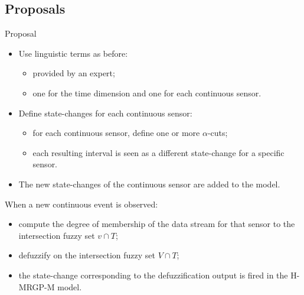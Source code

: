 \documentclass[9pt, handout]{beamer}
\begin{document}
    \subsection{Proposals}
      \begin{frame}{Proposal}
        \pause
        \begin{itemize}
          \item Use linguistic terms as before:
          \begin{itemize}
            \item provided by an expert;
            \item one for the time dimension and one for each continuous sensor.
          \end{itemize}
          \pause
          \item Define state-changes for each continuous sensor:
          \begin{itemize}
            \item for each continuous sensor, define one or more $\alpha$-cuts;
            \item each resulting interval is seen as a different state-change for a specific sensor.
          \end{itemize}
          \pause
          \item The new state-changes of the continuous sensor are added to the model.
        \end{itemize}
        \pause
        When a new continuous event is observed:
        \pause
        \begin{itemize}
          \item compute the degree of membership of the data stream for that sensor to the intersection fuzzy set $v \cap T$;
          \item defuzzify on the intersection fuzzy set $V \cap T$;
          \item the state-change corresponding to the defuzzification output is fired in the H-MRGP-M model.
        \end{itemize}
      \end{frame}
      
\end{document}
